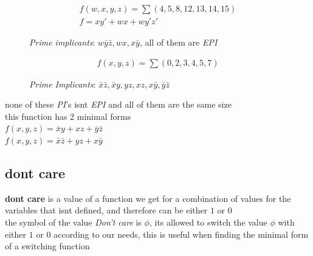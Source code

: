 \documentclass[a4paper,12pt]{article}
\begin{document}
\begin{my_example}
\begin{gather*}
  f(w,x,y,z) = \sum(4,5,8,12,13,14,15)\\
  f = xy' + wx + wy'z'
\end{gather*}
\begin{figure}[htbp]


\caption{\emph{Prime implicants}: \(w\bar{y}\bar{z}, wx, x\bar{y}\), all of them are \emph{EPI}}
\end{figure}
\end{my_example}
\begin{my_example}
\begin{gather*}
  f(x,y,z) = \sum(0,2,3,4,5,7)
\end{gather*}
\begin{figure}[htbp]


\caption{\emph{Prime Implicants}: \(\bar{x}\bar{z}, \bar{x}y, yz, xz, x\bar{y}, \bar{y}\bar{z}\)}
\end{figure}

none of these \emph{PI}'s isnt \emph{EPI} and all of them are the same size\\
this function has 2 minimal forms\\
\(f(x,y,z) = \bar{x}y + xz + \bar{y}\bar{z}\)\\
\(f(x,y,z) = \bar{x}\bar{z} + yz + x\bar{y}\)\\
\end{my_example}
\subsection{dont care}
\label{sec:orgd886573}
\textbf{dont care} is a value of a function we get for a combination of values for the variables that isnt defined, and therefore can be either \(1\) or \(0\)\\
the symbol of the value \emph{Don't care} is \(\phi\), its allowed to switch the value \(\phi\) with either \(1\) or \(0\) according to our needs, this is useful when finding the minimal form of a switching function\\
\end{document}
